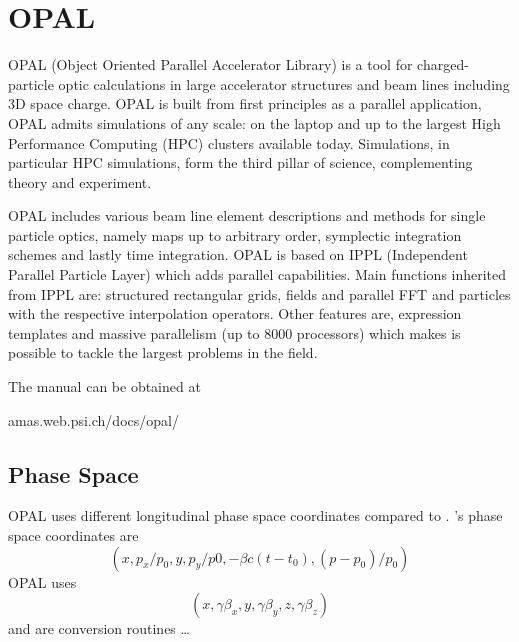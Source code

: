 \chapter{OPAL}
\label{c:opal}

OPAL (Object Oriented Parallel Accelerator Library) is a tool for charged-particle optic
calculations in large accelerator structures and beam lines including 3D space charge. OPAL is built
from first principles as a parallel application, OPAL admits simulations of any scale: on the laptop
and up to the largest High Performance Computing (HPC) clusters available today. Simulations, in
particular HPC simulations, form the third pillar of science, complementing theory and experiment.

OPAL includes various beam line element descriptions and methods for single particle optics, namely
maps up to arbitrary order, symplectic integration schemes and lastly time integration. OPAL is
based on IPPL (Independent Parallel Particle Layer) which adds parallel capabilities. Main functions
inherited from IPPL are: structured rectangular grids, fields and parallel FFT and particles with
the respective interpolation operators. Other features are, expression templates and massive
parallelism (up to 8000 processors) which makes is possible to tackle the largest problems in the
field.

The  manual can be obtained at
\begin{example} 
  amas.web.psi.ch/docs/opal/   
\end{example}

\section{Phase Space}
\label{s:opal.space}

OPAL uses different longitudinal phase space coordinates compared to \bmad.  \bmad's phase space
coordinates are
\begin{equation}
  (x, p_x/p_0, y, p_y/p0, -\beta c (t - t_0), (p-p_0)/p_0)
\end{equation}
OPAL uses
\begin{equation}
  (x, \gamma \beta_x,  y, \gamma \beta_y, z, \gamma \beta_z)
\end{equation}
 and  are conversion routines \ldots

